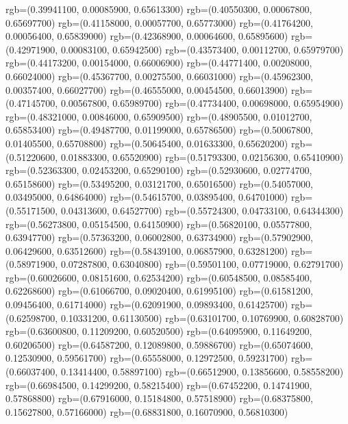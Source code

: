 {{        rgb=(0.39941100, 0.00085900, 0.65613300)
        rgb=(0.40550300, 0.00067800, 0.65697700)
        rgb=(0.41158000, 0.00057700, 0.65773000)
        rgb=(0.41764200, 0.00056400, 0.65839000)
        rgb=(0.42368900, 0.00064600, 0.65895600)
        rgb=(0.42971900, 0.00083100, 0.65942500)
        rgb=(0.43573400, 0.00112700, 0.65979700)
        rgb=(0.44173200, 0.00154000, 0.66006900)
        rgb=(0.44771400, 0.00208000, 0.66024000)
        rgb=(0.45367700, 0.00275500, 0.66031000)
        rgb=(0.45962300, 0.00357400, 0.66027700)
        rgb=(0.46555000, 0.00454500, 0.66013900)
        rgb=(0.47145700, 0.00567800, 0.65989700)
        rgb=(0.47734400, 0.00698000, 0.65954900)
        rgb=(0.48321000, 0.00846000, 0.65909500)
        rgb=(0.48905500, 0.01012700, 0.65853400)
        rgb=(0.49487700, 0.01199000, 0.65786500)
        rgb=(0.50067800, 0.01405500, 0.65708800)
        rgb=(0.50645400, 0.01633300, 0.65620200)
        rgb=(0.51220600, 0.01883300, 0.65520900)
        rgb=(0.51793300, 0.02156300, 0.65410900)
        rgb=(0.52363300, 0.02453200, 0.65290100)
        rgb=(0.52930600, 0.02774700, 0.65158600)
        rgb=(0.53495200, 0.03121700, 0.65016500)
        rgb=(0.54057000, 0.03495000, 0.64864000)
        rgb=(0.54615700, 0.03895400, 0.64701000)
        rgb=(0.55171500, 0.04313600, 0.64527700)
        rgb=(0.55724300, 0.04733100, 0.64344300)
        rgb=(0.56273800, 0.05154500, 0.64150900)
        rgb=(0.56820100, 0.05577800, 0.63947700)
        rgb=(0.57363200, 0.06002800, 0.63734900)
        rgb=(0.57902900, 0.06429600, 0.63512600)
        rgb=(0.58439100, 0.06857900, 0.63281200)
        rgb=(0.58971900, 0.07287800, 0.63040800)
        rgb=(0.59501100, 0.07719000, 0.62791700)
        rgb=(0.60026600, 0.08151600, 0.62534200)
        rgb=(0.60548500, 0.08585400, 0.62268600)
        rgb=(0.61066700, 0.09020400, 0.61995100)
        rgb=(0.61581200, 0.09456400, 0.61714000)
        rgb=(0.62091900, 0.09893400, 0.61425700)
        rgb=(0.62598700, 0.10331200, 0.61130500)
        rgb=(0.63101700, 0.10769900, 0.60828700)
        rgb=(0.63600800, 0.11209200, 0.60520500)
        rgb=(0.64095900, 0.11649200, 0.60206500)
        rgb=(0.64587200, 0.12089800, 0.59886700)
        rgb=(0.65074600, 0.12530900, 0.59561700)
        rgb=(0.65558000, 0.12972500, 0.59231700)
        rgb=(0.66037400, 0.13414400, 0.58897100)
        rgb=(0.66512900, 0.13856600, 0.58558200)
        rgb=(0.66984500, 0.14299200, 0.58215400)
        rgb=(0.67452200, 0.14741900, 0.57868800)
        rgb=(0.67916000, 0.15184800, 0.57518900)
        rgb=(0.68375800, 0.15627800, 0.57166000)
        rgb=(0.68831800, 0.16070900, 0.56810300)
}}
